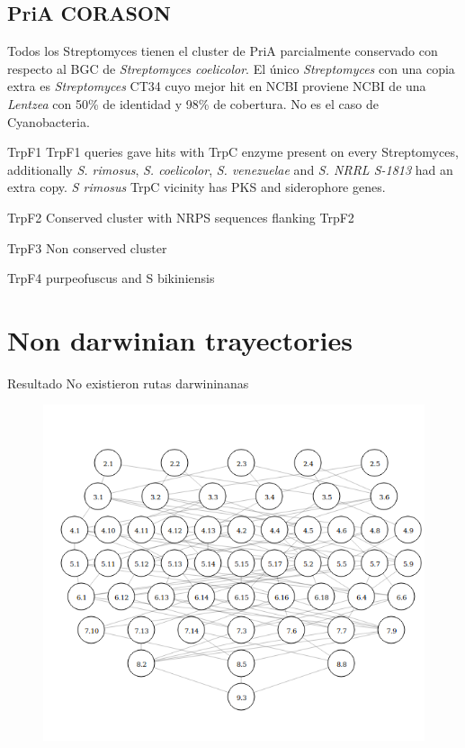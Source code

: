 \documentclass[12pt,twoside]{reedthesis}
\begin{document}
  \subsection{PriA CORASON}\label{pria-corason}
  
  Todos los Streptomyces tienen el cluster de PriA parcialmente conservado
  con respecto al BGC de \emph{Streptomyces coelicolor}. El único
  \emph{Streptomyces} con una copia extra es \emph{Streptomyces} CT34 cuyo
  mejor hit en NCBI proviene NCBI de una \emph{Lentzea} con 50\% de
  identidad y 98\% de cobertura. No es el caso de Cyanobacteria.
  
  TrpF1 TrpF1 queries gave hits with TrpC enzyme present on every
  Streptomyces, additionally \emph{S. rimosus}, \emph{S. coelicolor},
  \emph{S. venezuelae} and \emph{S. NRRL S-1813} had an extra copy.
  \emph{S rimosus} TrpC vicinity has PKS and siderophore genes.
  
  TrpF2 Conserved cluster with NRPS sequences flanking TrpF2
  
  TrpF3 Non conserved cluster
  
  TrpF4 purpeofuscus and S bikiniensis \clearpage  
  
  \section{Non darwinian trayectories}\label{non-darwinian-trayectories}
  
  Resultado No existieron rutas darwininanas
  
  \begin{figure}[h!tbp]
  \centering
  \includegraphics[angle = 0,scale = 0.6]{conclusion/Solocirculos.png}
  \caption[Non darwinian trayectories]{\footnotesize{}}
  \label{fig:PriARutas}
  \end{figure}
  
\end{document}
